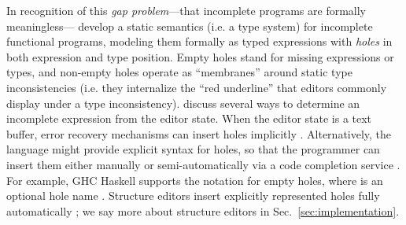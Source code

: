 
In recognition of this \emph{gap problem}---that incomplete programs are formally meaningless---\citet{popl-paper} develop a static semantics (i.e. a type system) for incomplete 
functional programs, modeling them formally as typed expressions with \emph{holes} in 
both expression and type position. 
Empty holes stand for missing expressions or types,
and non-empty holes operate as ``membranes'' around static type inconsistencies 
(i.e. they internalize the ``red underline'' that editors commonly display under a type inconsistency).
\citet{popl-paper,HazelnutSNAPL} discuss several ways to determine an incomplete expression from the editor state. When the editor state is a text buffer, error recovery mechanisms can insert holes implicitly \cite{DBLP:journals/siamcomp/AhoP72,charles1991practical,graham1979practical,DBLP:conf/oopsla/KatsJNV09}. Alternatively, the language might provide explicit syntax for holes, so that the programmer can insert them either manually  
or semi-automatically via a code completion service \cite{Amorim2016}. For example, GHC Haskell supports the notation  for empty holes, where  is an optional hole name \cite{GHCHoles}. Structure editors insert explicitly represented holes fully automatically \cite{popl-paper}; we say more about structure editors in Sec.~\ref{sec:implementation}.


